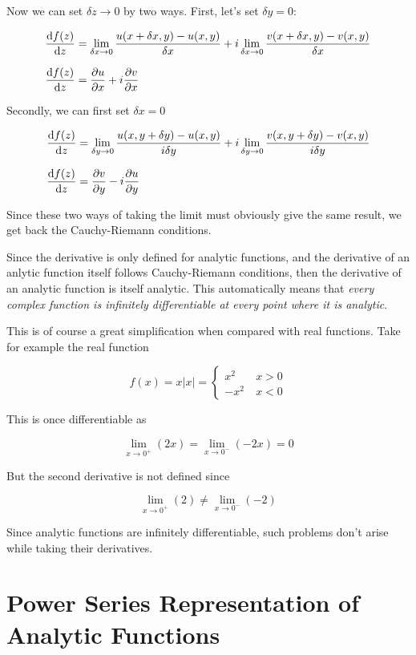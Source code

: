 \documentclass[12pt, letterpaper]{book}
\begin{document}
Now we can set $\delta z \to 0$ by two ways. First, let's set $\delta y= 0$: 

\[
    \setlength{\jot}{10pt}
    \begin{aligned}
        \dv{f(z)}{z} &= \lim_{\delta x\to 0}\frac{u(x+\delta x, y)-u(x,y)}{\delta x} + i\lim_{\delta x\to 0}\frac{v(x+\delta x, y)-v(x,y)}{\delta x}\\
        \dv{f(z)}{z} &= \pdv{u}{x}+i\pdv{v}{x}
    \end{aligned}
\]

Secondly, we can first set $\delta x= 0$

\[
    \setlength{\jot}{10pt}
    \begin{aligned}
        \dv{f(z)}{z} &= \lim_{\delta y\to 0}\frac{u(x, y+\delta y)-u(x,y)}{i\delta y} + i\lim_{\delta y\to 0}\frac{v(x, y+\delta y)-v(x,y)}{i\delta y}\\
        \dv{f(z)}{z} &= \pdv{v}{y}-i\pdv{u}{y}
    \end{aligned}
\]

Since these two ways of taking the limit must obviously give the same result, we get back the Cauchy-Riemann conditions. 

Since the derivative is only defined for analytic functions, and the derivative of an anlytic function itself follows Cauchy-Riemann conditions, then the derivative of an analytic function is itself analytic. This automatically means that \emph{every complex function is infinitely differentiable at every point where it is analytic}.  

This is of course a great simplification when compared with real functions. Take for example the real function

$$f(x)= x|x|= \begin{cases}
    x^2  \ & x>0\\
    -x^2 \ & x<0
\end{cases}$$

This is once differentiable as 

\[\lim_{x\to 0^+} (2x)= \lim_{x\to 0^-} (-2x)= 0 \]

But the second derivative is not defined since 

\[\lim_{x\to 0^+} (2) \neq \lim_{x\to 0^-} (-2)\]

Since analytic functions are infinitely differentiable, such problems don't arise while taking their derivatives.

\section{Power Series Representation of Analytic Functions}
\end{document}
